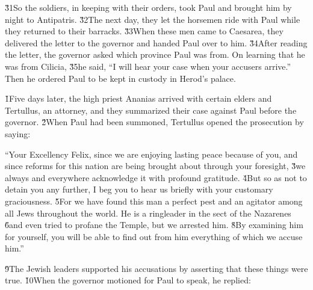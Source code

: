\v{31}So the soldiers, in keeping with their orders, took Paul and brought him by night to Antipatris. \v{32}The next day, they let the horsemen ride with Paul while they returned to their barracks. \v{33}When these men came to Caesarea, they delivered the letter to the governor and handed Paul over to him. \v{34}After reading the letter, the governor asked which province Paul was from. On learning that he was from Cilicia, \v{35}he said, ``I will hear your case when your accusers arrive.'' Then he ordered Paul to be kept in custody in Herod's palace.

\v{1}Five days later, the high priest Ananias arrived with certain elders and Tertullus, an attorney, and they summarized their case against Paul before the governor. \v{2}When Paul had been summoned, Tertullus opened the prosecution by saying:

``Your Excellency Felix, since we are enjoying lasting peace because of you, and since reforms for this nation are being brought about through your foresight, \v{3}we always and everywhere acknowledge it with profound gratitude. \v{4}But so as not to detain you any further, I beg you to hear us briefly with your customary graciousness. \v{5}For we have found this man a perfect pest and an agitator among all Jews throughout the world. He is a ringleader in the sect of the Nazarenes \v{6}and even tried to profane the Temple, but we arrested him. \v{8}By examining him for yourself, you will be able to find out from him everything of which we accuse him.''

\v{9}The Jewish leaders supported his accusations by asserting that these things were true. \v{10}When the governor motioned for Paul to speak, he replied:

